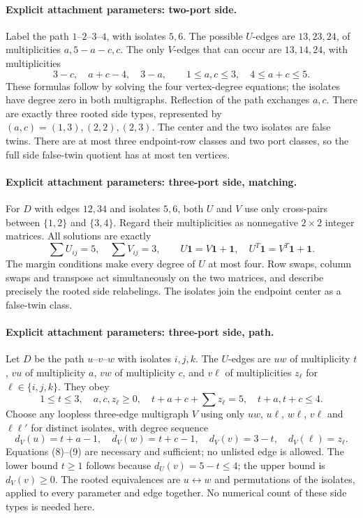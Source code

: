 \documentclass[11pt]{article}
\begin{document}
\paragraph{Explicit attachment parameters: two-port side.}
Label the path $1$--$2$--$3$--$4$, with isolates $5,6$.
The possible $U$-edges are $13,23,24$, of multiplicities
$a,5-a-c,c$. The only $V$-edges that can occur are $13,14,24$,
with multiplicities
\[
 3-c,\quad a+c-4,\quad 3-a,\qquad
 1\leq a,c\leq3,\quad4\leq a+c\leq5.              \tag{6}
\]
These formulas follow by solving the four vertex-degree equations;
the isolates have degree zero in both multigraphs. Reflection of
the path exchanges $a,c$. There are exactly three rooted side
types, represented by $(a,c)=(1,3),(2,2),(2,3)$. The center and
the two isolates are false twins. There are at most three
endpoint-row classes and two port classes, so the full side
false-twin quotient has at most ten vertices.

\paragraph{Explicit attachment parameters: three-port side, matching.}
For $D$ with edges $12,34$ and isolates $5,6$, both $U$ and $V$
use only cross-pairs between $\{1,2\}$ and $\{3,4\}$. Regard their
multiplicities as nonnegative $2\times2$ integer matrices. All
solutions are exactly
\[
 \sum U_{ij}=5,\quad \sum V_{ij}=3,\qquad
 U\mathbf1=V\mathbf1+\mathbf1,\quad
 U^T\mathbf1=V^T\mathbf1+\mathbf1.                 \tag{7}
\]
The margin conditions make every degree of $U$ at most four.
Row swaps, column swaps and transpose act simultaneously on the
two matrices, and describe precisely the rooted side relabelings.
The isolates join the endpoint center as a false-twin class.

\paragraph{Explicit attachment parameters: three-port side, path.}
Let $D$ be the path $u$--$v$--$w$ with isolates $i,j,k$.
The $U$-edges are $uw$ of multiplicity $t$, $vu$ of multiplicity
$a$, $vw$ of multiplicity $c$, and $v\ell$ of multiplicities
$z_\ell$ for $\ell\in\{i,j,k\}$. They obey
\[
 1\leq t\leq3,\quad a,c,z_\ell\geq0,\quad
 t+a+c+\sum z_\ell=5,\quad t+a,t+c\leq4.           \tag{8}
\]
Choose any loopless three-edge multigraph $V$ using only
$uw$, $u\ell$, $w\ell$, $v\ell$ and $\ell\ell'$ for distinct
isolates, with degree sequence
\[
 d_V(u)=t+a-1,\quad d_V(w)=t+c-1,\quad
 d_V(v)=3-t,\quad d_V(\ell)=z_\ell.                \tag{9}
\]
Equations (8)--(9) are necessary and sufficient; no unlisted
edge is allowed. The lower bound $t\geq1$ follows because
$d_U(v)=5-t\leq4$; the upper bound is $d_V(v)\geq0$.
The rooted equivalences are $u\leftrightarrow w$ and permutations
of the isolates, applied to every parameter and edge together.
No numerical count of these side types is needed here.
\end{document}
